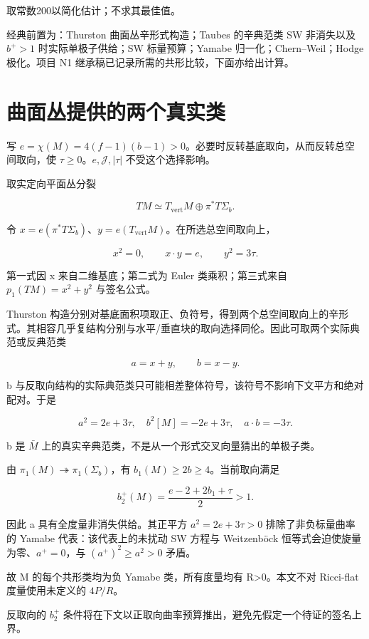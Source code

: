 \documentclass[UTF8,11pt,fontset=none]{ctexart}
\begin{document}
取常数200以简化估计；不求其最佳值。

经典前置为：Thurston 曲面丛辛形式构造；Taubes 的辛典范类 SW 非消失以及 \(b^+>1\) 时实际单极子供给；SW 标量预算；Yamabe 归一化；Chern--Weil；Hodge 极化。项目 N1 继承稿已记录所需的共形比较，下面亦给出计算。

\section{曲面丛提供的两个真实类}\label{ch10:ux66f2ux9762ux4e1bux63d0ux4f9bux7684ux4e24ux4e2aux771fux5b9eux7c7b}

写 \(e=\chi(M)=4(f-1)(b-1)>0\)。必要时反转基底取向，从而反转总空间取向，使 \(\tau\ge0\)。\(e,\mathcal J,|\tau|\) 不受这个选择影响。

取实定向平面丛分裂

\[
TM\simeq T_{\mathrm{vert}}M\oplus\pi^*T\Sigma_b.
\]

令 \(x=e(\pi^*T\Sigma_b)\)、\(y=e(T_{\mathrm{vert}}M)\)。在所选总空间取向上，

\[
x^2=0,\qquad x\cdot y=e,\qquad y^2=3\tau.
\tag{10.4}\label{eq:r10:4}
\]

第一式因 x 来自二维基底；第二式为 Euler 类乘积；第三式来自 \(p_1(TM)=x^2+y^2\) 与签名公式。

Thurston 构造分别对基底面积项取正、负符号，得到两个总空间取向上的辛形式。其相容几乎复结构分别与水平/垂直块的取向选择同伦。因此可取两个实际典范或反典范类

\[
a=x+y,\qquad b=x-y.
\]

b 与反取向结构的实际典范类只可能相差整体符号，该符号不影响下文平方和绝对配对。于是

\[
\boxed{
 a^2=2e+3\tau,\quad b^2[M]=-2e+3\tau,
 \quad a\cdot b=-3\tau.
}
\tag{10.5}\label{eq:r10:5}
\]

b 是 \(\bar M\) 上的真实辛典范类，不是从一个形式交叉向量猜出的单极子类。

由 \(\pi_1(M)\twoheadrightarrow\pi_1(\Sigma_b)\)，有 \(b_1(M)\ge2b\ge4\)。当前取向满足

\[
b_2^+(M)=\frac{e-2+2b_1+\tau}{2}>1.
\]

因此 a 具有全度量非消失供给。其正平方 \(a^2=2e+3\tau>0\) 排除了非负标量曲率的 Yamabe 代表：该代表上的未扰动 SW 方程与 Weitzenböck 恒等式会迫使旋量为零、\(a^+=0\)，与 \((a^+)^2\ge a^2>0\) 矛盾。

故 M 的每个共形类均为负 Yamabe 类，所有度量均有 R\textgreater0。本文不对 Ricci-flat 度量使用未定义的 \(4P/R\)。

反取向的 \(b_2^+\) 条件将在下文以正取向曲率预算推出，避免先假定一个待证的签名上界。
\end{document}
